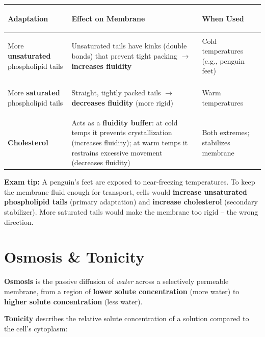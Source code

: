 \documentclass[11pt, letterpaper]{article}
\begin{document}
\noindent
{\renewcommand{\arraystretch}{1.5}
\begin{tabularx}{\textwidth}{>{\bfseries\raggedright\arraybackslash}p{3.5cm}>{\raggedright\arraybackslash}X>{\raggedright\arraybackslash}p{3.8cm}}
\toprule
\rowcolor{tableheaderteal}
\textbf{Adaptation} & \textbf{Effect on Membrane} & \textbf{When Used} \\
\midrule
\rowcolor{rowTe}
More \textbf{unsaturated} phospholipid tails
  & Unsaturated tails have kinks (double bonds) that prevent tight packing $\to$ \textbf{increases fluidity}
  & Cold temperatures (e.g., penguin feet) \\
\rowcolor{rowA}
More \textbf{saturated} phospholipid tails
  & Straight, tightly packed tails $\to$ \textbf{decreases fluidity} (more rigid)
  & Warm temperatures \\
\rowcolor{rowTe}
\textbf{Cholesterol}
  & Acts as a \textbf{fluidity buffer}: at cold temps it prevents crystallization (increases fluidity); at warm temps it restrains excessive movement (decreases fluidity)
  & Both extremes; stabilizes membrane \\
\bottomrule
\end{tabularx}}

\vspace{4pt}
\begin{tcolorbox}[colback=part5bg, colframe=sectionteal, arc=3pt, boxrule=1pt]
\textbf{Exam tip:} A penguin's feet are exposed to near-freezing temperatures. To keep the membrane fluid enough for transport, cells would \textbf{increase unsaturated phospholipid tails} (primary adaptation) and \textbf{increase cholesterol} (secondary stabilizer). More saturated tails would make the membrane too rigid -- the wrong direction.
\end{tcolorbox}

\section*{Osmosis \& Tonicity}

\textbf{Osmosis} is the passive diffusion of \emph{water} across a selectively permeable membrane, from a region of \textbf{lower solute concentration} (more water) to \textbf{higher solute concentration} (less water).

\vspace{4pt}
\textbf{Tonicity} describes the relative solute concentration of a solution compared to the cell's cytoplasm:
\end{document}
